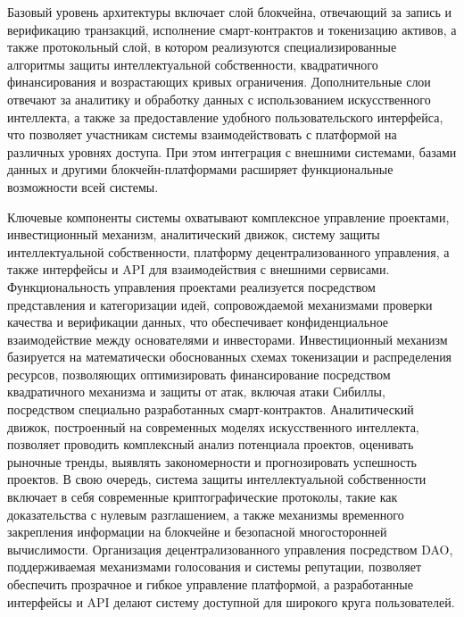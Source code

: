\documentclass[
    14pt,
    specialist,
    candidate, %
    subf, %
    href,
    dotsinheaders=false
]{disser}
\begin{document}
Базовый уровень архитектуры включает слой блокчейна, отвечающий за запись и верификацию транзакций, исполнение смарт-контрактов и токенизацию активов, а также протокольный слой, в котором реализуются специализированные алгоритмы защиты интеллектуальной собственности, квадратичного финансирования и возрастающих кривых ограничения. Дополнительные слои отвечают за аналитику и обработку данных с использованием искусственного интеллекта, а также за предоставление удобного пользовательского интерфейса, что позволяет участникам системы взаимодействовать с платформой на различных уровнях доступа. При этом интеграция с внешними системами, базами данных и другими блокчейн-платформами расширяет функциональные возможности всей системы.

Ключевые компоненты системы охватывают комплексное управление проектами, инвестиционный механизм, аналитический движок, систему защиты интеллектуальной собственности, платформу децентрализованного управления, а также интерфейсы и API для взаимодействия с внешними сервисами. Функциональность управления проектами реализуется посредством представления и категоризации идей, сопровождаемой механизмами проверки качества и верификации данных, что обеспечивает конфиденциальное взаимодействие между основателями и инвесторами. Инвестиционный механизм базируется на математически обоснованных схемах токенизации и распределения ресурсов, позволяющих оптимизировать финансирование посредством квадратичного механизма и защиты от атак, включая атаки Сибиллы, посредством специально разработанных смарт-контрактов. Аналитический движок, построенный на современных моделях искусственного интеллекта, позволяет проводить комплексный анализ потенциала проектов, оценивать рыночные тренды, выявлять закономерности и прогнозировать успешность проектов. В свою очередь, система защиты интеллектуальной собственности включает в себя современные криптографические протоколы, такие как доказательства с нулевым разглашением, а также механизмы временного закрепления информации на блокчейне и безопасной многосторонней вычислимости. Организация децентрализованного управления посредством DAO, поддерживаемая механизмами голосования и системы репутации, позволяет обеспечить прозрачное и гибкое управление платформой, а разработанные интерфейсы и API делают систему доступной для широкого круга пользователей.
\end{document}
